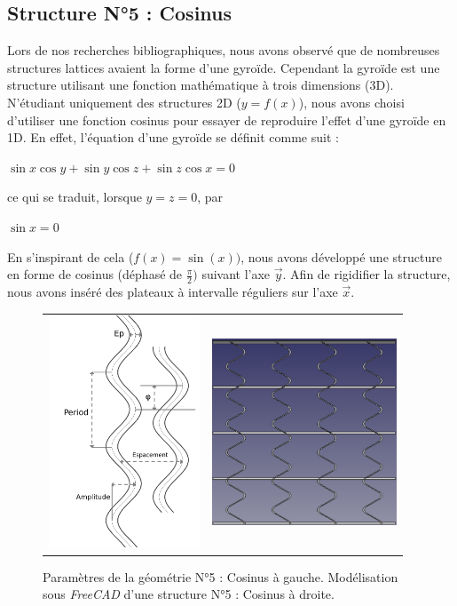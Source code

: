 \documentclass[a4paper]{article}
\begin{document}
	\subsection{Structure N°5 : Cosinus}
	\hspace{0.5cm}Lors de nos recherches bibliographiques, nous avons observé que de nombreuses structures lattices avaient la forme d’une gyroïde. Cependant la gyroïde est une structure utilisant une fonction mathématique à trois dimensions (3D). N’étudiant uniquement des structures 2D ($y=f(x)$), nous avons choisi d’utiliser une fonction cosinus pour essayer de reproduire l’effet d’une gyroïde en 1D. En effet, l'équation d'une gyroïde se définit comme suit :
	
	\begin{center} 
	{$\sin x\cos y+\sin y\cos z+\sin z\cos x=0$}
	\end{center}
	{ce qui se traduit, lorsque $y=z=0$, par}
	\begin{center}
	{$\sin x=0$}
	\end{center}
	
	En s’inspirant de cela ($f(x)=\sin(x))$, nous avons développé une structure en forme de cosinus (déphasé de $\frac{\pi}{2})$ suivant l’axe $\vec{y}$. Afin de rigidifier la structure, nous avons inséré des plateaux à intervalle réguliers sur l’axe $\vec{x}$.
	
	\begin{figure}[H]
		\centering
		\begin{tabular}{m{6cm}m{5.5cm}}
			\includegraphics[width=4.5cm]{Images/5/Cosinus.pdf} & \includegraphics[width=5.5cm]{Images/5/Freecad_cosinus.png}\\
		\end{tabular}
		\caption{Paramètres de la géométrie N°5 : Cosinus à gauche. Modélisation sous \textit{FreeCAD} d’une structure N°5 : Cosinus à droite.}
	\end{figure}	
	
\end{document}
